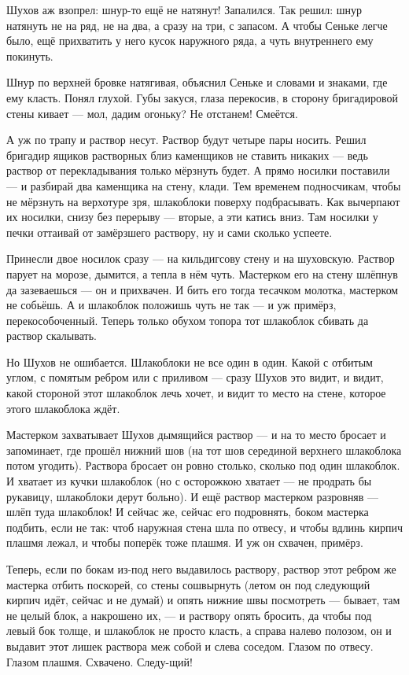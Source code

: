 Шухов аж взопрел: шнур-то ещё не натянут! Запалился. Так решил: шнур натянуть не на ряд, не на
два, а сразу на три, с запасом. А чтобы Сеньке легче было, ещё прихватить у него кусок
наружного ряда, а чуть внутреннего ему покинуть.

Шнур по верхней бровке натягивая, объяснил Сеньке и словами и знаками, где ему класть. Понял
глухой. Губы закуся, глаза перекосив, в сторону бригадировой стены кивает --- мол, дадим
огоньку? Не отстанем! Смеётся.

А уж по трапу и раствор несут. Раствор будут четыре пары носить. Решил бригадир ящиков
растворных близ каменщиков не ставить никаких --- ведь раствор от перекладывания только
мёрзнуть будет. А прямо носилки поставили --- и разбирай два каменщика на стену, клади. Тем
временем подносчикам, чтобы не мёрзнуть на верхотуре зря, шлакоблоки поверху подбрасывать.
Как вычерпают их носилки, снизу без перерыву --- вторые, а эти катись вниз. Там носилки у печки
оттаивай от замёрзшего раствору, ну и сами сколько успеете.

Принесли двое носилок сразу --- на кильдигсову стену и на шуховскую. Раствор парует на морозе,
дымится, а тепла в нём чуть. Мастерком его на стену шлёпнув да зазеваешься --- он и прихвачен. И
бить его тогда тесачком молотка, мастерком не собьёшь. А и шлакоблок положишь чуть не так --- и
уж примёрз, перекособоченный. Теперь только обухом топора тот шлакоблок сбивать да раствор
скалывать.

Но Шухов не ошибается. Шлакоблоки не все один в один. Какой с отбитым углом, с помятым ребром
или с приливом --- сразу Шухов это видит, и видит, какой стороной этот шлакоблок лечь хочет, и
видит то место на стене, которое этого шлакоблока ждёт.

Мастерком захватывает Шухов дымящийся раствор --- и на то место бросает и запоминает, где
прошёл нижний шов (на тот шов серединой верхнего шлакоблока потом угодить). Раствора бросает
он ровно столько, сколько под один шлакоблок. И хватает из кучки шлакоблок (но с осторожкою
хватает --- не продрать бы рукавицу, шлакоблоки дерут больно). И ещё раствор мастерком
разровняв --- шлёп туда шлакоблок! И сейчас же, сейчас его подровнять, боком мастерка подбить,
если не так: чтоб наружная стена шла по отвесу, и чтобы вдлинь кирпич плашмя лежал, и чтобы
поперёк тоже плашмя. И уж он схвачен, примёрз.

Теперь, если по бокам из-под него выдавилось раствору, раствор этот ребром же мастерка
отбить поскорей, со стены сошвырнуть (летом он под следующий кирпич идёт, сейчас и не думай) и
опять нижние швы посмотреть --- бывает, там не целый блок, а накрошено их, --- и раствору опять
бросить, да чтобы под левый бок толще, и шлакоблок не просто класть, а справа налево полозом,
он и выдавит этот лишек раствора меж собой и слева соседом. Глазом по отвесу. Глазом плашмя.
Схвачено. Следу-щий!

